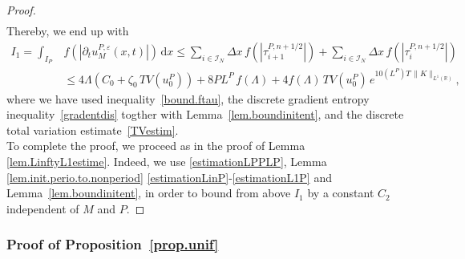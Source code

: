 \documentclass[11pt]{amsart}
\newcommand{\dd}{\mathrm{d}}
\newcommand{\pa}{\partial}
\newcommand{\R}{\mathbb{R}}
\newcommand{\I}{\mathcal{I}_N}
\newcommand{\eps}{\varepsilon}
\begin{document}
\begin{proof}
\begin{align}
\end{align}
Thereby, we end up with
\begin{align*}
  I_1=  \int_{I_P} &f\left(\left|\pa_t u^{P,\eps}_M(x,t)\right|\right) \, \dd x \leq \sum_{i\in\I} \Delta x \, f\left(\left|\tau_{i + 1}^{P, n + 1/2}\right|\right) + \sum_{i\in\I} \Delta x\,  f\left(\left|\tau_{i } ^{P, n +1/2}\right|\right)\\
    &\leq 4\Lambda \left(C_0 + \zeta_0 \,TV(u^P_0)\right) + 8 PL^P \, f(\Lambda) + 4f(\Lambda) \, TV(u^P_0) \, e^{10 (L^P)T \, \|K\|_{L^1(\R)}},
\end{align*}
where we have used inequality~\eqref{bound.ftau}, the discrete gradient entropy inequality~\eqref{gradentdis} togther with Lemma~\ref{lem.boundinitent}, and the discrete total variation estimate~\eqref{TVestim}.\\
To complete the proof, we proceed as in the proof of Lemma \ref{lem.LinftyL1estime}. Indeed, we use \eqref{estimationLPPLP}, Lemma \ref{lem.init.perio.to.nonperiod} \eqref{estimationLinP}-\eqref{estimationL1P} and Lemma~\ref{lem.boundinitent},  in order to bound from above $I_1$ by a constant  $C_2$  independent of $M$ and $P$. 
\end{proof}



\subsubsection{Proof of Proposition~\ref{prop.unif}}
\end{document}

